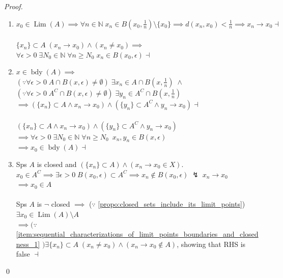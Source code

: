 \documentclass[notoc,notitlepage]{tufte-book}
\DeclareMathOperator{\bdy}{bdy }
\DeclareMathOperator{\Lim}{Lim }
\begin{document}
\begin{proof}
  \begin{enumerate}
    \item $x_0 \in \Lim(A) \implies \forall n \in \mathbb{N} \; x_n \in B\left(x_0, \frac{1}{n}\right) \setminus \{ x_0 \} \implies d(x_n, x_0) < \frac{1}{n} \implies x_n \to x_0 \dashv$ \\
      $ $ \\
      $\{ x_n \} \subset A \; ( x_n \to x_0 ) \land ( x_n \neq x_0 ) \implies$ \\
      $\forall \epsilon > 0 \; \exists N_0 \in \mathbb{N} \; \forall n \geq N_0 \; x_n \in B(x_0, \epsilon) \dashv$

    \item $x \in \bdy(A) \implies$ \\
      $( \because \forall \epsilon > 0 \; A \cap B(x, \epsilon) \neq \emptyset ) \; \exists x_n \in A \cap B\left(x, \frac{1}{n}\right) \; \land $ \\
      $(\because \forall \epsilon > 0 \; A^C \cap B(x, \epsilon) \neq \emptyset ) \; \exists y_n \in A^C \cap B\left(x, \frac{1}{n}\right)$ \\
      $\implies ( \{ x_n \} \subset A \land x_n \to x_0 ) \land \left( \{ y_n \} \subset A^C \land y_n \to x_0 \right) \dashv$ \\
      $ $ \\
      $( \{ x_n \} \subset A \land x_n \to x_0 ) \land ( \{ y_n \} \subset A^C \land y_n \to x_0 )$ \\
      $\implies \forall \epsilon > 0 \; \exists N_0 \in \mathbb{N} \; \forall n \geq N_0 \enspace x_n, y_n \in B(x, \epsilon)$ \\
      $\implies x_0 \in \bdy(A) \dashv$

    \item Sps $A$ is closed and $( \{ x_n \} \subset A ) \land ( x_n \to x_0 \in X )$. \\
      $x_0 \in A^C \implies \exists \epsilon > 0 \; B(x_0, \epsilon) \subset A^C \implies x_n \notin B(x_0, \epsilon) \; \lightning \; x_n \to x_0$ \\
      $\implies x_0 \in A$ \\
      $ $ \\
      Sps $A$ is $\neg$ closed $\implies$ ($\because$ \cref{propo:closed_sets_include_its_limit_points}) $\exists x_0 \in \Lim(A) \setminus A$ \\
      $\implies (\because$ \cref{item:sequential_characterizations_of_limit_points_boundaries_and_closedness_1} $) \exists \{ x_n \} \subset A \; (x_n \neq x_0) \land (x_n \to x_0 \notin A)$, showing that RHS is false $\dashv$
  \end{enumerate}\qed\
\end{proof}
\end{document}
